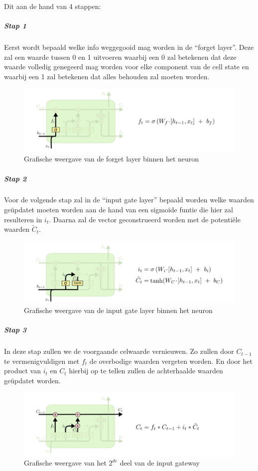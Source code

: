 Dit aan de hand van 4 stappen:
\subparagraph{Stap 1}
Eerst wordt bepaald welke info weggegooid mag worden in de ``forget layer''.
Deze zal een waarde tussen 0 en 1 uitvoeren waarbij een 0 zal betekenen dat deze waarde volledig genegeerd mag worden voor elke component van de cell state en waarbij een 1 zal betekenen dat alles behouden zal moeten worden. 

\begin{figure}
    \centering
    \caption{Grafische weergave van de forget layer binnen het neuron~\autocite{Olah2015}}
    \label{fig:lstmfig3}
    \includegraphics[width=0.7\linewidth]{lstmFig3}
\end{figure}


\subparagraph{Stap 2}
Voor de volgende stap zal in de ``input gate layer'' bepaald worden welke waarden ge\"{u}pdatet moeten worden aan de hand van een sigmo\"{i}de funtie die hier zal resulteren in $i_t$. Daarna zal de vector geconstrueerd worden met de potenti\"{e}le waarden $\tilde{C}_t$.

\begin{figure}
    \centering
    \caption{Grafische weergave van de input gate layer binnen het neuron~\autocite{Olah2015}}
    \label{fig:lstmfig4}
    \includegraphics[width=0.7\linewidth]{lstmFig4}
\end{figure}

\subparagraph{Stap 3}
In deze stap zullen we de voorgaande celwaarde vernieuwen. Zo zullen door $C_{t-1}$ te vermenigvuldigen met $f_t$ de overbodige waarden vergeten worden. En door het product van $i_t$ en $C_t$ hierbij op te tellen zullen de achterhaalde waarden ge\"{u}pdatet worden. 

\begin{figure}
    \centering
    \caption{Grafische weergave van het $2^{de}$ deel van de input gateway~\autocite{Olah2015}}
    \label{fig:lstmfig5}
    \includegraphics[width=0.7\linewidth]{lstmFig5}
\end{figure}

